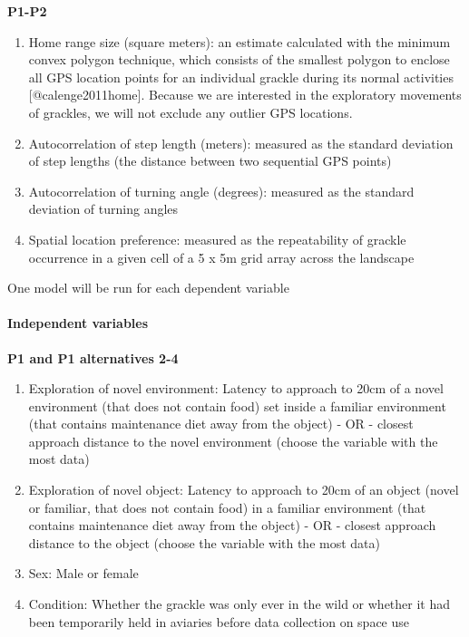 \documentclass[]{article}
\let\oldparagraph\paragraph
\renewcommand{\paragraph}[1]{\oldparagraph{#1}\mbox{}}
\begin{document}
\textbf{P1-P2}

\begin{enumerate}
\def\labelenumi{\arabic{enumi})}
\item
  Home range size (square meters): an estimate calculated with the
  minimum convex polygon technique, which consists of the smallest
  polygon to enclose all GPS location points for an individual grackle
  during its normal activities {[}@calenge2011home{]}. Because we are
  interested in the exploratory movements of grackles, we will not
  exclude any outlier GPS locations.
\item
  Autocorrelation of step length (meters): measured as the standard
  deviation of step lengths (the distance between two sequential GPS
  points)
\item
  Autocorrelation of turning angle (degrees): measured as the standard
  deviation of turning angles
\item
  Spatial location preference: measured as the repeatability of grackle
  occurrence in a given cell of a 5 x 5m grid array across the landscape
\end{enumerate}

One model will be run for each dependent variable

\paragraph{\texorpdfstring{\textbf{Independent
variables}}{Independent variables}}\label{independent-variables}

\textbf{P1 and P1 alternatives 2-4}

\begin{enumerate}
\def\labelenumi{\arabic{enumi})}
\item
  Exploration of novel environment: Latency to approach to 20cm of a
  novel environment (that does not contain food) set inside a familiar
  environment (that contains maintenance diet away from the object) - OR
  - closest approach distance to the novel environment (choose the
  variable with the most data)
\item
  Exploration of novel object: Latency to approach to 20cm of an object
  (novel or familiar, that does not contain food) in a familiar
  environment (that contains maintenance diet away from the object) - OR
  - closest approach distance to the object (choose the variable with
  the most data)
\item
  Sex: Male or female
\item
  Condition: Whether the grackle was only ever in the wild or whether it
  had been temporarily held in aviaries before data collection on space
  use
\end{enumerate}
\end{document}
